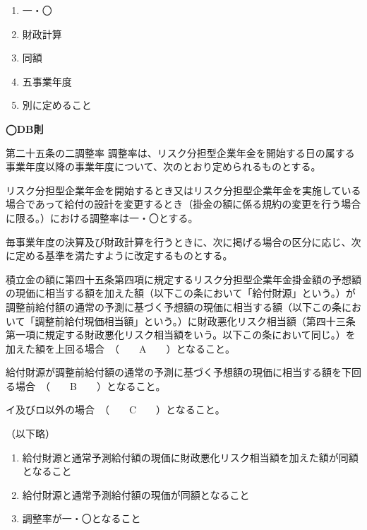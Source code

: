 \begin{answerbox}
  \begin{enumerate}[A:]
    \item 一・〇
    \item 財政計算
    \item 同額
    \item 五事業年度
    \item 別に定めること
  \end{enumerate}
\end{answerbox}

\begin{fillblank}[数理人試験 H30 問題4 設問1]
  \noindent \textbf{◯DB則}
  \begin{lawstructure}
    \begin{lawarticle}{第二十五条の二}{調整率}
      調整率は、リスク分担型企業年金を開始する日の属する事業年度以降の事業年度について、次のとおり定められるものとする。

      リスク分担型企業年金を開始するとき又はリスク分担型企業年金を実施している場合であって給付の設計を変更するとき（掛金の額に係る規約の変更を行う場合に限る。）における調整率は一・〇とする。

      毎事業年度の決算及び財政計算を行うときに、次に掲げる場合の区分に応じ、次に定める基準を満たすように改定するものとする。

      積立金の額に第四十五条第四項に規定するリスク分担型企業年金掛金額の予想額の現価に相当する額を加えた額（以下この条において「給付財源」という。）が調整前給付額の通常の予測に基づく予想額の現価に相当する額（以下この条において「調整前給付現価相当額」という。）に財政悪化リスク相当額（第四十三条第一項に規定する財政悪化リスク相当額をいう。以下この条において同じ。）を加えた額を上回る場合　（　　A　　）となること。

      給付財源が調整前給付額の通常の予測に基づく予想額の現価に相当する額を下回る場合　（　　B　　）となること。

      イ及びロ以外の場合　（　　C　　）となること。

      （以下略）
    \end{lawarticle}
  \end{lawstructure}
\end{fillblank}

\begin{answerbox}
  \begin{enumerate}[A:]
    \item 給付財源と通常予測給付額の現価に財政悪化リスク相当額を加えた額が同額となること
    \item 給付財源と通常予測給付額の現価が同額となること
    \item 調整率が一・〇となること
  \end{enumerate}
\end{answerbox}


